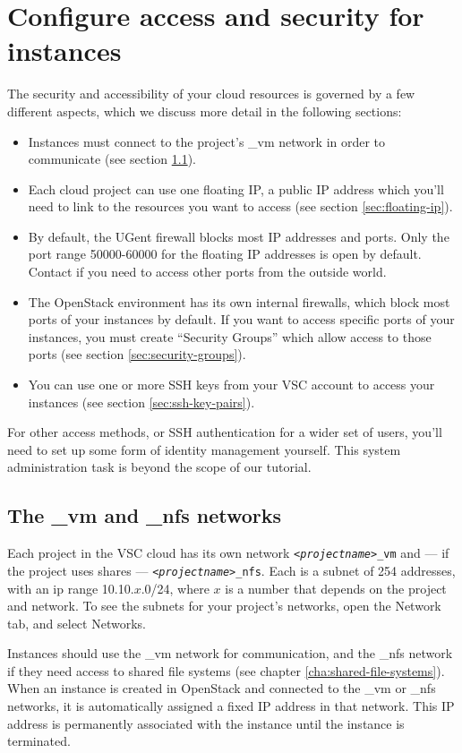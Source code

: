 \chapter{Configure access and security for instances}\label{cha:conf-access-secur}
The security and accessibility of your cloud resources is governed by
a few different aspects, which we discuss more detail in the following
sections:
\begin{itemize}
\item Instances must connect to the project's \_vm network in order to
  communicate (see section \ref{sec:_vm-_nfs-networks}).
\item Each cloud project can use one floating IP, a public IP address
  which you'll need to link to the resources you want to access
  (see section \ref{sec:floating-ip}).
\item By default, the UGent firewall blocks most IP addresses and
  ports.  Only the port range 50000-60000 for the floating IP
  addresses is open by default.  Contact \cloudinfo if you need to
  access other ports from the outside world.
\item The OpenStack environment has its own internal firewalls, which
  block most ports of your instances by default.  If you want to
  access specific ports of your instances, you must create ``Security
  Groups'' which allow access to those ports (see section
  \ref{sec:security-groups}).
\item You can use one or more SSH keys from your VSC account to access
  your instances (see section \ref{sec:ssh-key-pairs}).
\end{itemize}
For other access methods, or SSH authentication for a wider set of
users, you'll need to set up some form of identity management
yourself.  This system administration task is beyond the scope of our
tutorial.

\section{The \_vm and \_nfs networks}\label{sec:_vm-_nfs-networks}
Each project in the VSC cloud has its own network
\texttt{\emph{<projectname>}\_vm} and --- if the project uses shares
--- \texttt{\emph{<projectname>}\_nfs}.   Each is a subnet of 254
addresses, with an ip range 10.10.$x$.0/24, where $x$ is a number that
depends on the project and network.  To see the subnets for your
project's networks, open the Network tab, and select Networks.

Instances should use the \_vm network for communication, and the \_nfs
network if they need access to shared file systems (see chapter
\ref{cha:shared-file-systems}).  When an instance is created in
\gls{OpenStack} and connected to the \_vm or \_nfs networks, it is
automatically assigned a fixed IP address in that network. This IP
address is permanently associated with the instance until the instance
is terminated.


